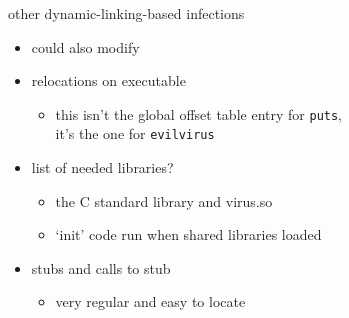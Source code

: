 \begin{frame}{other dynamic-linking-based infections}
    \begin{itemize}
    \item could also modify
    \vspace{.5cm}
    \item relocations on executable
        \begin{itemize}
        \item this isn't the global offset table entry for \texttt{puts}, \\ it's the one for \texttt{evilvirus}
        \end{itemize}
    \item list of needed libraries?
        \begin{itemize}
        \item the C standard library and virus.so
        \item `init' code run when shared libraries loaded
        \end{itemize}
    \item stubs and calls to stub
        \begin{itemize}
        \item very regular and easy to locate
        \end{itemize}
    \end{itemize}
\end{frame}
